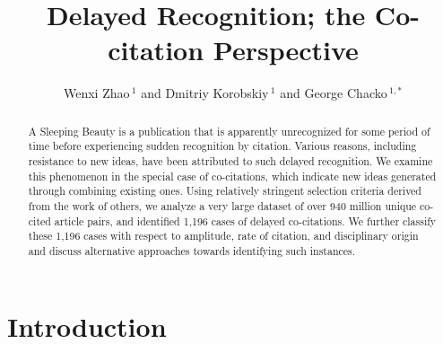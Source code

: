 \documentclass[utf8]{frontiersSCNS}
\def\firstAuthorLast{Zhao {et~al.}} %
\def\Authors{Wenxi Zhao\,$^{1}$ and Dmitriy Korobskiy\,$^{1}$  and George Chacko\,$^{1,*}$} %
\begin{document}
\onecolumn
{}

\title[Delayed Co-citations]{Delayed Recognition; the Co-citation Perspective} 

\author[\firstAuthorLast ]{\Authors} %
\address{} %
\correspondance{} %

\extraAuth{}%

\maketitle

\begin{abstract}
A Sleeping Beauty is a publication that is apparently unrecognized for some period of time before experiencing sudden recognition by citation. Various reasons, including resistance to new ideas, have been attributed to such delayed recognition. We examine this phenomenon in the special case of co-citations, which indicate new ideas generated through combining existing ones.  Using relatively stringent selection criteria derived from the work of others, we analyze a very large dataset of over 940 million unique co-cited article pairs, and identified 1,196 cases of delayed co-citations. We further classify these 1,196 cases with respect to amplitude, rate of citation, and disciplinary origin and discuss alternative approaches towards identifying such instances.

\end{abstract}

\section{Introduction}
\end{document}
